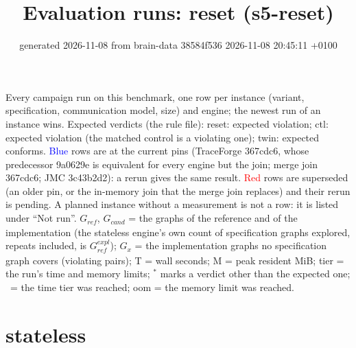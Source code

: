 \documentclass[10pt]{article}
\title{Evaluation runs: \textsf{reset} (s5-reset)}
\author{}
\date{generated 2026-11-08 from brain-data 38584f536 2026-11-08 20:45:11 +0100}
\begin{document}
\maketitle\small
\noindent Every campaign run on this benchmark, one row per instance (variant, specification, communication model, size) and engine; the newest run of an instance wins. Expected verdicts (the rule file): reset: expected violation; ctl: expected violation (the matched control is a violating one); twin: expected conforms. \textcolor{blue}{Blue} rows are at the current pins (TraceForge 367cdc6, whose predecessor 9a0629e is equivalent for every engine but the join; merge join 367cdc6; JMC 3c43b2d2): a rerun gives the same result. \textcolor{red}{Red} rows are superseded (an older pin, or the in-memory join that the merge join replaces) and their rerun is pending. A planned instance without a measurement is not a row: it is listed under ``Not run''. $G_{\mathit{ref}}$, $G_{\mathit{cand}}$ = the graphs of the reference and of the implementation (the stateless engine's own count of specification graphs explored, repeats included, is $G_{\mathit{ref}}^{\mathit{expl}}$); $G_x$ = the implementation graphs no specification graph covers (violating pairs); T = wall seconds; M = peak resident MiB; tier = the run's time and memory limits; $^{\ast}$ marks a verdict other than the expected one; \faClock\ = the time tier was reached; oom = the memory limit was reached.

\section*{stateless}
\end{document}
